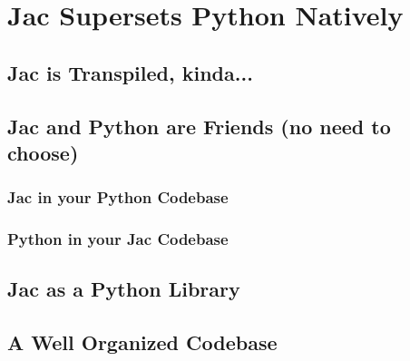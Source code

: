 \chapter{Jac Supersets Python Natively}
\section{Jac is Transpiled, kinda...}
\section{Jac and Python are Friends (no need to choose)}
\subsection{Jac in your Python Codebase}
\subsection{Python in your Jac Codebase}
\section{Jac as a Python Library}
\section{A Well Organized Codebase}